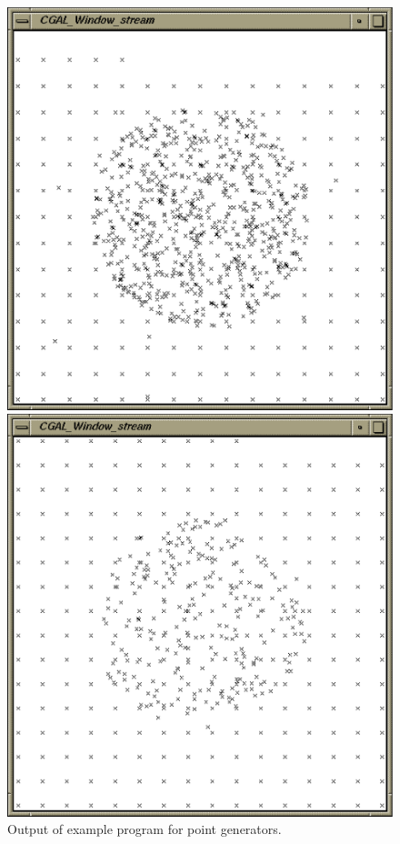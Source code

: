 \begin{ccTexOnly}
  \begin{figure}
    \noindent
    \hspace*{0.025\textwidth}%
    \begin{minipage}{0.45\textwidth}%
      \includegraphics[width=\textwidth]{Generator/generators_prog1.ps}
      \caption{Output of example program for point generators.}
      \label{figurePointGenerator}
    \end{minipage}%
    \hspace*{0.05\textwidth}%
    \begin{minipage}{0.45\textwidth}%
      \includegraphics[width=\textwidth]{Generator/generators_prog2.ps}

\end{minipage}
\end{figure}
\end{ccTexOnly}
